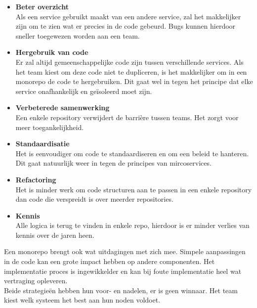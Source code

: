 \begin{itemize}
    \item \textbf{Beter overzicht}\\
        Als een service gebruikt maakt van een andere service, zal het makkelijker zijn om te zien wat er precies in de code gebeurd. Bugs kunnen hierdoor sneller toegewezen worden aan een team.
    \item \textbf{Hergebruik van code}\\
        Er zal altijd gemeenschappelijke code zijn tussen verschillende services. Als het team kiest om deze code niet te dupliceren, is het makkelijker om in een monorepo de code te hergebruiken. Dit gaat wel in tegen het principe dat elke service onafhankelijk en geïsoleerd moet zijn.
    \item \textbf{Verbeterede samenwerking}\\
        Een enkele repository verwijdert de barrière tussen teams. Het zorgt voor meer toegankelijkheid. 
    \item \textbf{Standaardisatie}\\
        Het is eenvoudiger om code te standaardiseren en om een beleid te hanteren. Dit gaat natuurlijk weer in tegen de principes van mircoservices.
    \item \textbf{Refactoring}\\
        Het is minder werk om code structuren aan te passen in een enkele repository dan code die verspreidt is over meerder repositories.
    \item \textbf{Kennis}\\
        Alle logica is terug te vinden in enkele repo, hierdoor is er minder verlies van kennis over de jaren heen.
\end{itemize}
Een monorepo brengt ook wat uitdagingen met zich mee. Simpele aanpassingen in de code kan een grote impact hebben op andere componenten. Het implementatie proces is ingewikkelder en kan bij foute implementatie heel wat vertraging opleveren.\\ 
Beide strategieën hebben hun voor- en nadelen, er is geen winnaar. Het team kiest welk systeem het best aan hun noden voldoet.

\newpage
